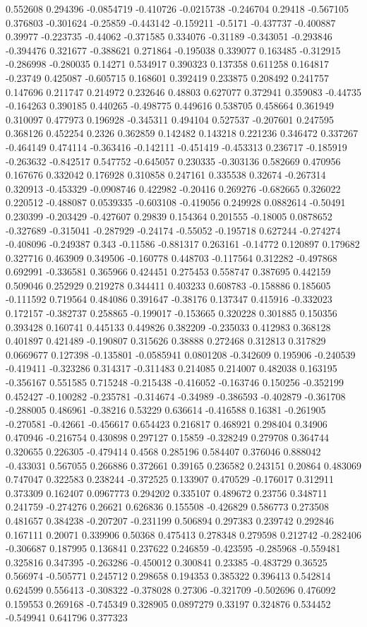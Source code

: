 0.552608 0.294396 -0.0854719 -0.410726 -0.0215738 -0.246704 0.29418 -0.567105 0.376803 -0.301624 -0.25859 -0.443142 -0.159211 -0.5171 -0.437737 -0.400887 0.39977 -0.223735 -0.44062 -0.371585 0.334076 -0.31189 -0.343051 -0.293846 -0.394476 0.321677 -0.388621 0.271864 -0.195038 0.339077 0.163485 -0.312915 -0.286998 -0.280035 0.14271 0.534917 0.390323 0.137358 0.611258 0.164817 -0.23749 0.425087 -0.605715 0.168601 0.392419 0.233875 0.208492 0.241757 0.147696 0.211747 0.214972 0.232646 0.48803 0.627077 0.372941 0.359083 -0.44735 -0.164263 0.390185 0.440265 -0.498775 0.449616 0.538705 0.458664 0.361949 0.310097 0.477973 0.196928 -0.345311 0.494104 0.527537 -0.207601 0.247595 0.368126 0.452254 0.2326 0.362859 0.142482 0.143218 0.221236 0.346472 0.337267 -0.464149 0.474114 -0.363416 -0.142111 -0.451419 -0.453313 0.236717 -0.185919 -0.263632 -0.842517 0.547752 -0.645057 0.230335 -0.303136 0.582669 0.470956 0.167676 0.332042 0.176928 0.310858 0.247161 0.335538 0.32674 -0.267314 0.320913 -0.453329 -0.0908746 0.422982 -0.20416 0.269276 -0.682665 0.326022 0.220512 -0.488087 0.0539335 -0.603108 -0.419056 0.249928 0.0882614 -0.50491 0.230399 -0.203429 -0.427607 0.29839 0.154364 0.201555 -0.18005 0.0878652 -0.327689 -0.315041 -0.287929 -0.24174 -0.55052 -0.195718 0.627244 -0.274274 -0.408096 -0.249387 0.343 -0.11586 -0.881317 0.263161 -0.14772 0.120897 0.179682 0.327716 0.463909 0.349506 -0.160778 0.448703 -0.117564 0.312282 -0.497868 0.692991 -0.336581 0.365966 0.424451 0.275453 0.558747 0.387695 0.442159 0.509046 0.252929 0.219278 0.344411 0.403233 0.608783 -0.158886 0.185605 -0.111592 0.719564 0.484086 0.391647 -0.38176 0.137347 0.415916 -0.332023 0.172157 -0.382737 0.258865 -0.199017 -0.153665 0.320228 0.301885 0.150356 0.393428 0.160741 0.445133 0.449826 0.382209 -0.235033 0.412983 0.368128 0.401897 0.421489 -0.190807 0.315626 0.38888 0.272468 0.312813 0.317829 0.0669677 0.127398 -0.135801 -0.0585941 0.0801208 -0.342609 0.195906 -0.240539 -0.419411 -0.323286 0.314317 -0.311483 0.214085 0.214007 0.482038 0.163195 -0.356167 0.551585 0.715248 -0.215438 -0.416052 -0.163746 0.150256 -0.352199 0.452427 -0.100282 -0.235781 -0.314674 -0.34989 -0.386593 -0.402879 -0.361708 -0.288005 0.486961 -0.38216 0.53229 0.636614 -0.416588 0.16381 -0.261905 -0.270581 -0.42661 -0.456617 0.654423 0.216817 0.468921 0.298404 0.34906 0.470946 -0.216754 0.430898 0.297127 0.15859 -0.328249 0.279708 0.364744 0.320655 0.226305 -0.479414 0.4568 0.285196 0.584407 0.376046 0.888042 -0.433031 0.567055 0.266886 0.372661 0.39165 0.236582 0.243151 0.20864 0.483069 0.747047 0.322583 0.238244 -0.372525 0.133907 0.470529 -0.176017 0.312911 0.373309 0.162407 0.0967773 0.294202 0.335107 0.489672 0.23756 0.348711 0.241759 -0.274276 0.26621 0.626836 0.155508 -0.426829 0.586773 0.273508 0.481657 0.384238 -0.207207 -0.231199 0.506894 0.297383 0.239742 0.292846 0.167111 0.20071 0.339906 0.50368 0.475413 0.278348 0.279598 0.212742 -0.282406 -0.306687 0.187995 0.136841 0.237622 0.246859 -0.423595 -0.285968 -0.559481 0.325816 0.347395 -0.263286 -0.450012 0.300841 0.23385 -0.483729 0.36525 0.566974 -0.505771 0.245712 0.298658 0.194353 0.385322 0.396413 0.542814 0.624599 0.556413 -0.308322 -0.378028 0.27306 -0.321709 -0.502696 0.476092 0.159553 0.269168 -0.745349 0.328905 0.0897279 0.33197 0.324876 0.534452 -0.549941 0.641796 0.377323 
